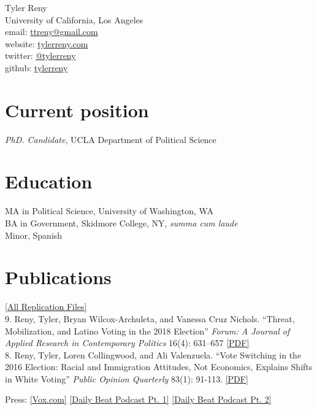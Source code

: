 \documentclass[11pt, a4paper]{article}
\newcommand{\years}[1]{\marginnote{\scriptsize #1}}
\begin{document}
{\LARGE Tyler Reny}\\[1cm]
 University of California, Los Angeles\\
email: \href{mailto:ttreny@gmail.com}{ttreny@gmail.com}\\
website: \href{http://www.tylerreny.com}{tylerreny.com}\\ 
twitter: \href{http://www.twitter.com/tylerreny}{@tylerreny}\\ 
github: \href{https://github.com/tylerreny}{tylerreny}\\ 

\section*{Current position}
\emph{PhD. Candidate}, UCLA Department of Political Science

\section*{Education}
\years{2015}\textsc{MA} in Political Science, University of Washington, WA\\
\years{2011}\textsc{BA} in Government, Skidmore College, NY, \textit{summa cum laude}\\
Minor, Spanish

\section*{Publications}
\href{https://dataverse.harvard.edu/dataverse/tylerreny}{[All Replication Files]}\\

\years{2019} 9. Reny, Tyler, Bryan Wilcox-Archuleta, and Vanessa Cruz Nichols. ``Threat, Mobilization, and Latino Voting in the 2018 Election''  \textit{Forum: A Journal of Applied Research in Contemporary Politics} 16(4): 631–657 \href{http://tylerreny.github.io/pdf/pubs/reny_wilcox_cruz_nichols2019.pdf}{[PDF]} \\

\years{2018} 8. Reny, Tyler, Loren Collingwood, and Ali Valenzuela. ``Vote Switching in the 2016 Election: Racial and Immigration Attitudes, Not Economics, Explains Shifts in White Voting''  \textit{Public Opinion Quarterly} 83(1): 91-113. \href{http://tylerreny.github.io/pdf/pubs/final_submission_reny_etal_poq_public.pdf}{[PDF]} 

Press: \href{https://www.vox.com/policy-and-politics/2018/10/16/17980820/trump-obama-2016-race-racism-class-economy-2018-midterm}{[Vox.com]} \href{http://www.btrtoday.com/listen/thedailybeat/vote-switching-in-the-2016-election-with-tyler-reny-part-1/}{[Daily Beat Podcast Pt. 1]} \href{http://www.btrtoday.com/listen/thedailybeat/vote-switching-white-economic-anxiety-more-with-tyler-reny-part2/}{[Daily Beat Podcast Pt. 2]}\\
\end{document}

